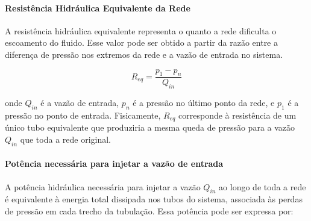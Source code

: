 \documentclass{article}
\begin{document}






\paragraph{Resistência Hidráulica Equivalente da Rede}
A resistência hidráulica equivalente representa o quanto a rede dificulta o escoamento do fluido. Esse valor pode ser obtido a partir da razão entre a diferença de pressão nos extremos da rede e a vazão de entrada no sistema.

\begin{equation}
R_{eq} = \frac{p_1 - p_n}{Q_{in}}
\label{eq:Req}
\end{equation}

onde $Q_{in}$ é a vazão de entrada, $p_n$ é a pressão no último ponto da rede, e $p_1$ é a pressão no ponto de entrada. Fisicamente, $R_{eq}$ corresponde à resistência de um único tubo equivalente que produziria a mesma queda de pressão para a vazão $Q_{in}$ que toda a rede original.

\paragraph{Potência necessária para injetar a vazão de entrada} 
A potência hidráulica necessária para injetar a vazão $Q_{in}$ ao longo de toda a rede é equivalente à energia total dissipada nos tubos do sistema, associada às perdas de pressão em cada trecho da tubulação. Essa potência pode ser expressa por:
\end{document}
